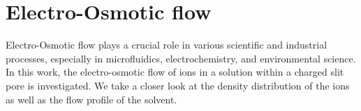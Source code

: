 
\section{Electro-Osmotic flow}
Electro-Osmotic flow plays a crucial role in various scientific and industrial processes, especially in microfluidics, electrochemistry, and environmental science. In this work, the electro-osmotic flow of ions in a solution within a charged slit pore is investigated. We take a closer look at the density distribution of the ions as well as the flow profile of the solvent.
